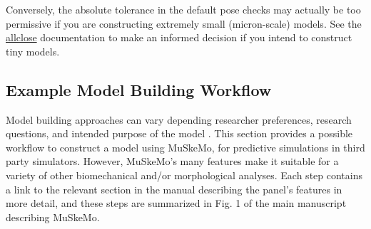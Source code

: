\documentclass{article}
\begin{document}
Conversely, the absolute tolerance in the default pose checks may actually be too permissive if you are constructing extremely small (micron-scale) models. See the \href{https://numpy.org/doc/stable/reference/generated/numpy.allclose.html}{allclose} documentation to make an informed decision if you intend to construct tiny models.


\subsection{Example Model Building Workflow}

Model building approaches can vary depending researcher preferences, research questions, and intended purpose of the model \cite{vansoestContributionMuscleProperties1993,casiusForwardDynamicsTwoDimensional2004, lautenschlagerEstimatingCranialMusculoskeletal2015,vanbijlertMusclecontrolledPhysicsSimulations2024,bishopHowBuildDinosaur2020,sellersMarchTitansLocomotor2013,}. This section provides a possible workflow to construct a model using MuSkeMo, for predictive simulations in third party simulators. However, MuSkeMo's many features make it suitable for a variety of other biomechanical and/or morphological analyses. Each step contains a link to the relevant section in the manual describing the panel's features in more detail, and these steps are summarized in Fig. 1 of the main manuscript describing MuSkeMo.
\end{document}
